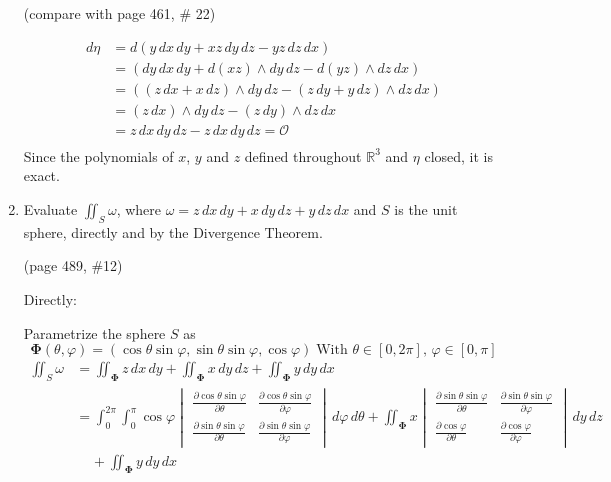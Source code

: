\documentclass{article}
\newcommand{\partis}[2]{\frac{\partial #2}{\partial #1}}
\begin{document}
\begin{enumerate}
    (compare with page 461, \# 22)

    \begin{align*}
        d\eta &= d (y\, dx \, dy + xz \, dy \, dz - yz \, dz \, dx) \\
        &= (dy \, dx \, dy + d(xz)\wedge  dy \, dz - d(yz) \wedge dz \, dx) \\
        &= ((z \, dx + x \, dz)\wedge  dy \, dz - (z\, dy + y \, dz) \wedge dz \, dx) \\
        &= (z \, dx) \wedge dy \, dz - (z\, dy) \wedge dz \, dx \\
        &= z \, dx \, dy \, dz - z \, dx \, dy \, dz = \mathcal{O}\\
    \end{align*}
    Since the polynomials of $x$, $y$ and $z$ defined throughout $\mathbb{R}^3$ and $\eta$ closed, it is exact.
    \newpage
    \item
    Evaluate $\displaystyle \iint_S \omega$, where $\omega = z\, dx \, dy + x \, dy \, dz + y \, dz \, dx$ and $S$ is the unit sphere, directly and by the Divergence Theorem.

    (page 489, \#12)

    Directly: 
    
    Parametrize the sphere $S$ as 
    \[ \boldsymbol \Phi (\theta, \varphi) = ( \cos\theta \sin\varphi , \sin\theta \sin\varphi, \cos\varphi)\; \text{With }\theta \in [0,2\pi],\, \varphi \in [0,\pi] \]
    \begin{align*}
        \iint_S \omega &= \iint_{\boldsymbol \Phi} z \, dx \, dy + \iint_{\boldsymbol \Phi} x \, dy \, dz + \iint_{\boldsymbol \Phi} y \, dy \, dx \\
        &= \int_0^{2\pi} \int_0^{\pi} \cos \varphi \begin{vmatrix}\partis{\theta}{\cos\theta \sin \varphi} & \partis{\varphi}{\cos\theta \sin \varphi} \\ \partis{\theta}{\sin\theta \sin\varphi} & \partis{\varphi}{\sin\theta \sin\varphi} \end{vmatrix} \, d\varphi \, d\theta + \iint_{\boldsymbol \Phi} x \begin{vmatrix} \partis{\theta}{\sin\theta \sin\varphi} & \partis{\varphi}{\sin\theta \sin\varphi} \\ \partis{\theta}{\cos \varphi} & \partis{\varphi}{\cos \varphi} \end{vmatrix}\, dy \, dz \\
        & \; \; \; \; + \iint_{\boldsymbol \Phi} y \, dy \, dx \\
    \end{align*}


\end{enumerate}
\end{document}
